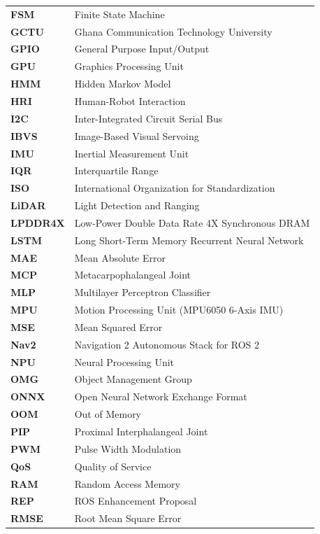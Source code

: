 \begin{longtable}{p{3.0cm}p{12.0cm}}
\textbf{FSM} & Finite State Machine \\
\textbf{GCTU} & Ghana Communication Technology University \\
\textbf{GPIO} & General Purpose Input/Output \\
\textbf{GPU} & Graphics Processing Unit \\
\textbf{HMM} & Hidden Markov Model \\
\textbf{HRI} & Human-Robot Interaction \\
\textbf{I2C} & Inter-Integrated Circuit Serial Bus \\
\textbf{IBVS} & Image-Based Visual Servoing \\
\textbf{IMU} & Inertial Measurement Unit \\
\textbf{IQR} & Interquartile Range \\
\textbf{ISO} & International Organization for Standardization \\
\textbf{LiDAR} & Light Detection and Ranging \\
\textbf{LPDDR4X} & Low-Power Double Data Rate 4X Synchronous DRAM \\
\textbf{LSTM} & Long Short-Term Memory Recurrent Neural Network \\
\textbf{MAE} & Mean Absolute Error \\
\textbf{MCP} & Metacarpophalangeal Joint \\
\textbf{MLP} & Multilayer Perceptron Classifier \\
\textbf{MPU} & Motion Processing Unit (MPU6050 6-Axis IMU) \\
\textbf{MSE} & Mean Squared Error \\
\textbf{Nav2} & Navigation 2 Autonomous Stack for ROS 2 \\
\textbf{NPU} & Neural Processing Unit \\
\textbf{OMG} & Object Management Group \\
\textbf{ONNX} & Open Neural Network Exchange Format \\
\textbf{OOM} & Out of Memory \\
\textbf{PIP} & Proximal Interphalangeal Joint \\
\textbf{PWM} & Pulse Width Modulation \\
\textbf{QoS} & Quality of Service \\
\textbf{RAM} & Random Access Memory \\
\textbf{REP} & ROS Enhancement Proposal \\
\textbf{RMSE} & Root Mean Square Error \\

\end{longtable}
